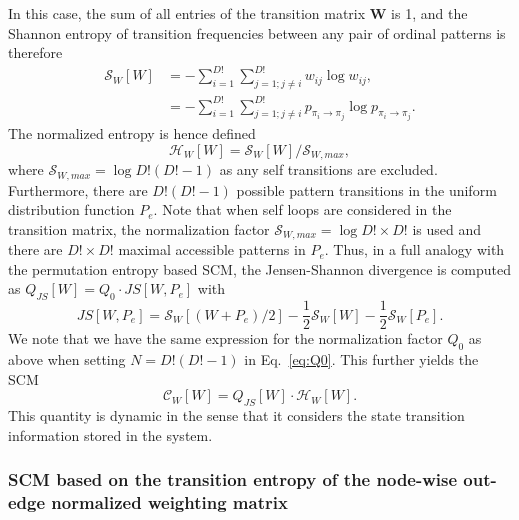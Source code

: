 \documentclass[aip,cha,reprint,nofootinbib]{revtex4-1}
\begin{document}
In this case, the sum of all entries of the transition matrix $\mathbf{W}$ is 1, and the Shannon entropy of transition frequencies between any pair of ordinal patterns is therefore 
\begin{equation}
\begin{split}
\mathcal{S}_{W}[W] &= - \sum_{i=1}^{D!} \sum_{j = 1; j \neq i}^{D!} w_{ij} \log w_{ij}, \\
& = - \sum_{i=1}^{D!} \sum_{j =1; j \neq i}^{D!} p_{\pi_i \to \pi_j} \log p_{\pi_i \to \pi_j}. 
\end{split}
\end{equation}
The normalized entropy is hence defined 
\begin{equation}
\mathcal{H}_{W}[W] = \mathcal{S}_{W}[W] / \mathcal{S}_{W, max}, 
\end{equation}
where $\mathcal{S}_{W, max} = \log D! (D! - 1)$ as any self transitions are excluded. Furthermore, there are $D! (D! - 1)$ possible pattern transitions in the uniform distribution function $P_e$. {\color{red}Note that when self loops are considered in the transition matrix, the normalization factor $\mathcal{S}_{W, max} = \log D! \times D!$ is used and there are $D! \times D!$ maximal accessible patterns in $P_e$. } Thus, in a full analogy with the permutation entropy based SCM, the Jensen-Shannon divergence is computed as $Q_{JS}[W] = Q_0 \cdot JS[W, P_e]$ with
\begin{equation}
JS [W, P_e] = \mathcal{S}_{W}[(W + P_e)/2] - \frac{1}{2}\mathcal{S}_{W}[W] - \frac{1}{2}\mathcal{S}_{W}[P_e]. 
\end{equation}
We note that we have the same expression for the normalization factor $Q_0$ as above when setting $N = D! (D! - 1)$ in Eq.~\eqref{eq:Q0}. This further yields the SCM 
\begin{equation}
\mathcal{C}_{W}[W] = Q_{JS}[W] \cdot \mathcal{H}_{W}[W].
\end{equation}
This quantity is dynamic in the sense that it considers the state transition information stored in the system. 

\subsubsection{SCM based on the transition entropy of the node-wise out-edge normalized weighting matrix}
\end{document}
